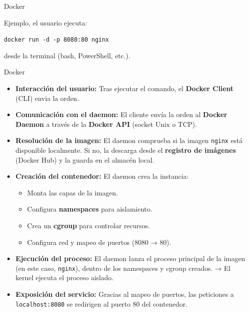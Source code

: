 \documentclass{beamer}
\begin{document}
\begin{frame}{Docker}

Ejemplo, el usuario ejecuta:

\begin{center}
    \texttt{docker run -d -p 8080:80 nginx}

\end{center}
desde la terminal (bash, PowerShell, etc.).

\end{frame}


\begin{frame}{Docker}
\begin{itemize}
  \item \textbf{Interacción del usuario:}  
  Tras ejecutar el comando, el \textbf{Docker Client} (CLI) envia la orden.

  \item \textbf{Comunicación con el daemon:}  
  El cliente envía la orden al \textbf{Docker Daemon} a través de la \textbf{Docker API} (socket Unix o TCP).

  \item \textbf{Resolución de la imagen:}  
  El daemon comprueba si la imagen \texttt{nginx} está disponible localmente.  
  Si no, la descarga desde el \textbf{registro de imágenes} (Docker Hub) y la guarda en el almacén local.

  \item \textbf{Creación del contenedor:}  
  El daemon crea la instancia:
  \begin{itemize}
    \item Monta las capas de la imagen.
    \item Configura \textbf{namespaces} para aislamiento.
    \item Crea un \textbf{cgroup} para controlar recursos.
    \item Configura red y mapeo de puertos (8080 → 80).
  \end{itemize}

  \item \textbf{Ejecución del proceso:}  
  El daemon lanza el proceso principal de la imagen (en este caso, \texttt{nginx}), dentro de los namespaces y cgroup creados.  
  → El kernel ejecuta el proceso aislado.

  \item \textbf{Exposición del servicio:}  
  Gracias al mapeo de puertos, las peticiones a \texttt{localhost:8080} se redirigen al puerto 80 del contenedor.
\end{itemize}
\end{frame}
\end{document}
